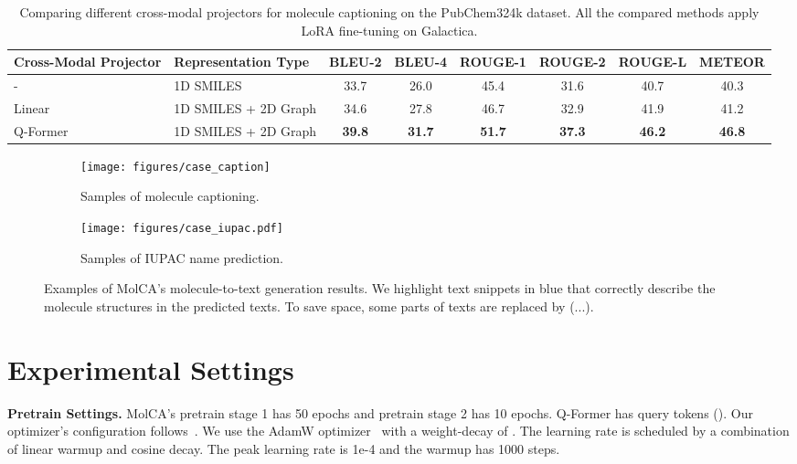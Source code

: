 \documentclass[11pt]{article}
\newcommand{\blue}[1]{\textcolor{bluehightlight}{#1}}
\begin{document}
   \begin{table*}[t]
    \centering
    \small
    \setlength{\tabcolsep}{4pt}
    \begin{tabular}{llcccccc} \toprule
    Cross-Modal Projector & Representation Type  & BLEU-2        & BLEU-4        & ROUGE-1       & ROUGE-2       & ROUGE-L       & METEOR        \\ \midrule
    -                     & 1D SMILES            & 33.7          & 26.0          & 45.4          & 31.6          & 40.7          & 40.3          \\
    Linear                & 1D SMILES + 2D Graph & 34.6          & 27.8          & 46.7          & 32.9          & 41.9          & 41.2          \\
    Q-Former              & 1D SMILES + 2D Graph & \textbf{39.8} & \textbf{31.7} & \textbf{51.7} & \textbf{37.3} & \textbf{46.2} & \textbf{46.8} \\ \bottomrule
    \end{tabular}
    \caption{Comparing different cross-modal projectors for molecule captioning on the PubChem324k dataset. All the compared methods apply LoRA fine-tuning on Galactica.}
    \label{tab:cross_project}
    \end{table*}


   \begin{figure*}[t!]
    \centering
    \small
    \begin{subfigure}[t]{0.63\textwidth}
    \centering
    \small
    \texttt{[image: figures/case\_caption]}
    \caption{Samples of molecule captioning.}
    \label{fig:case_caption}            
    \end{subfigure}
    \begin{subfigure}[t]{0.32\textwidth}
    \centering
    \small
    \texttt{[image: figures/case\_iupac.pdf]}
    \caption{Samples of IUPAC name prediction.}
    \label{fig:case_iupac}            
    \end{subfigure}
    \caption{Examples of MolCA's molecule-to-text generation results. We highlight text snippets in \blue{blue} that correctly describe the molecule structures in the predicted texts. To save space, some parts of texts are replaced by (...).}
    \label{fig:sample}
\end{figure*}

\section{Experimental Settings}
\label{app:settings}
\textbf{Pretrain Settings.} MolCA's pretrain stage 1 has 50 epochs and pretrain stage 2 has 10 epochs. Q-Former has  query tokens (). Our optimizer's configuration follows~\cite{BLIP2}. We use the AdamW optimizer~\citep{AdamW} with a weight-decay of . The learning rate is scheduled by a combination of linear warmup and cosine decay. The peak learning rate is 1e-4 and the warmup has 1000 steps. 
\end{document}
